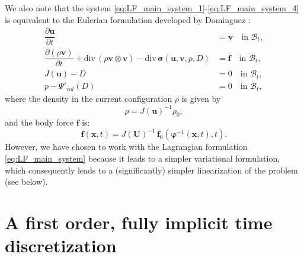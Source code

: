 \documentclass{sfuthesis}
\numberwithin{equation}{section}
\numberwithin{figure}{chapter}
\numberwithin{table}{chapter}
\theoremstyle{definition}
\def\*#1{{\mathbf{#1}}} %
\newcommand{\pder}[2]{\dfrac{\partial #1}{\partial #2}}
\newcommand{\divt}[1]{{\bm{\mathrm{div}} \, #1}}
\newcommand{\B}{\mathcal{B}}
\def\bsigma{{\bm{\sigma}}}
\begin{document}
We also note that the system \eqref{eq:LF_main_system_1}-\eqref{eq:LF_main_system_4} is equivalent to the Eulerian formulation developed by Dominguez \cite{Seba}:
\begin{subequations} \label{eq:EF_main}
    \begin{align}
    \label{eq:EF_1}\pder{\*u}{t} &= \*v  \quad \text{in } \B_t,\\
    \label{eq:EF_2}\pder{(\rho \*v)}{t} + \divt{(\rho \*v \otimes \*v)} - \divt{\bsigma(\*u,\*v,p,D)} &= \*f \quad \text{in } \B_t, \\
    \label{eq:EF_3}J(\*u)-D &= 0 \quad \text{in } \B_t, \\
    \label{eq:EF_4}p-\Psi'_{vol}(D) &= 0 \quad \text {in } \B_t,
    \end{align}
\end{subequations}
where the density in the current configuration $\rho$ is given by
\begin{equation}
    \rho = J(\*u)^{-1} \rho_0,
\end{equation}
and the body force $\*f$ is:
\begin{equation}
    \*f(\*x,t) = J(\*U)^{-1} \, \*f_0(\bm{\varphi}^{-1}(\*x,t),t).
\end{equation}
However, we have chosen to work with the Lagrangian formulation \eqref{eq:LF_main_system} because it leads to a simpler variational formulation, which consequently leads to a (significantly) simpler linearization of the problem (see below).

\section{A first order, fully implicit time discretization}
\end{document}
